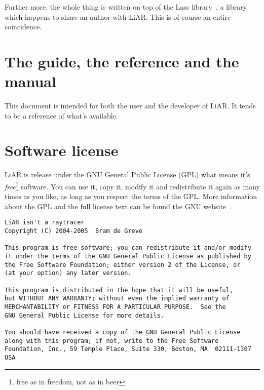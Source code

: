 Further more, the whole thing is written on top of the Lass library~\cite{Lass}, a \Cpp library which happens to share an author with LiAR.  This is of course an entire coincidence.

\section{The guide, the reference and the manual}

This document is intended for both the user and the developer of LiAR.  It tends to be a reference of what's available.


\section{Software license}

LiAR is release under the GNU General Public License (GPL) what means it's \emph{free}\footnote{free as in freedom, not as in beer} software.  You can use it, copy it, modify it and redistribute it again as many times as you like, as long as you respect the terms of the GPL.  More information about the GPL and the full license text can be found the GNU website~\cite{GPL}.

\begin{footnotesize}
\begin{verbatim}
LiAR isn't a raytracer
Copyright (C) 2004-2005  Bram de Greve

This program is free software; you can redistribute it and/or modify
it under the terms of the GNU General Public License as published by
the Free Software Foundation; either version 2 of the License, or
(at your option) any later version.

This program is distributed in the hope that it will be useful,
but WITHOUT ANY WARRANTY; without even the implied warranty of
MERCHANTABILITY or FITNESS FOR A PARTICULAR PURPOSE.  See the
GNU General Public License for more details.

You should have received a copy of the GNU General Public License
along with this program; if not, write to the Free Software
Foundation, Inc., 59 Temple Place, Suite 330, Boston, MA  02111-1307  USA
\end{verbatim}
\end{footnotesize}